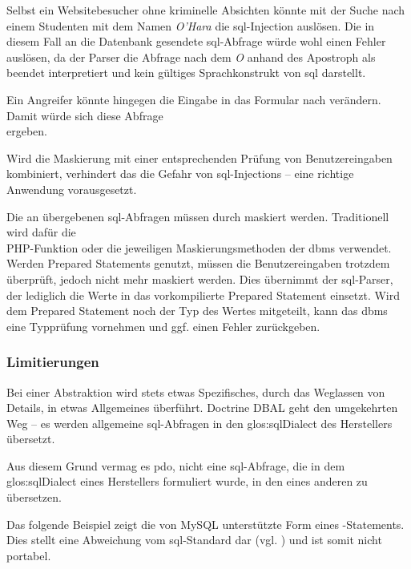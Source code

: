 Selbst ein Websitebesucher ohne kriminelle Absichten könnte mit der Suche nach einem Studenten mit dem Namen \textit{O'Hara} die \gls{sql}-Injection auslösen. Die in diesem Fall an die Datenbank gesendete \gls{sql}-Abfrage  würde wohl einen Fehler auslösen, da der Parser die Abfrage nach dem \textit{O} anhand des Apostroph als beendet interpretiert und  kein gültiges Sprachkonstrukt von \gls{sql} darstellt.

Ein Angreifer könnte hingegen die Eingabe in das Formular nach  verändern. Damit würde sich diese Abfrage\\  ergeben.

Wird die Maskierung mit einer entsprechenden Prüfung von Benutzereingaben kombiniert, verhindert das die Gefahr von \gls{sql}-Injections – eine richtige Anwendung vorausgesetzt.

Die an  übergebenen \gls{sql}-Abfragen müssen durch  maskiert werden. Traditionell wird dafür die\\ PHP-Funktion  oder die jeweiligen Maskierungsmethoden der \gls{dbms} verwendet. Werden Prepared Statements genutzt, müssen die Benutzereingaben trotzdem überprüft, jedoch nicht mehr maskiert werden. Dies übernimmt der \gls{sql}-Parser, der lediglich die Werte in das vorkompilierte Prepared Statement einsetzt. Wird dem Prepared Statement noch der Typ des Wertes mitgeteilt, kann das \gls{dbms} eine Typprüfung vornehmen und ggf. einen Fehler zurückgeben.

\subsubsection{Limitierungen}
\label{basics:doctrine:subsubsec:limitsOfAbstraction}
Bei einer Abstraktion wird stets etwas Spezifisches, durch das Weglassen von Details, in etwas Allgemeines überführt. Doctrine DBAL geht den umgekehrten Weg – es werden allgemeine \gls{sql}-Abfragen in den \gls{glos:sqlDialect} des Herstellers übersetzt.

Aus diesem Grund vermag es \gls{pdo}, nicht eine \gls{sql}-Abfrage, die in dem \gls{glos:sqlDialect} eines Herstellers formuliert wurde, in den eines anderen zu übersetzen.

Das folgende Beispiel zeigt die von MySQL unterstützte Form eines -Statements. Dies stellt eine Abweichung vom \gls{sql}-Standard dar (vgl. \cite[S. 388]{website:SQLStandard1992}) und ist somit nicht portabel.

